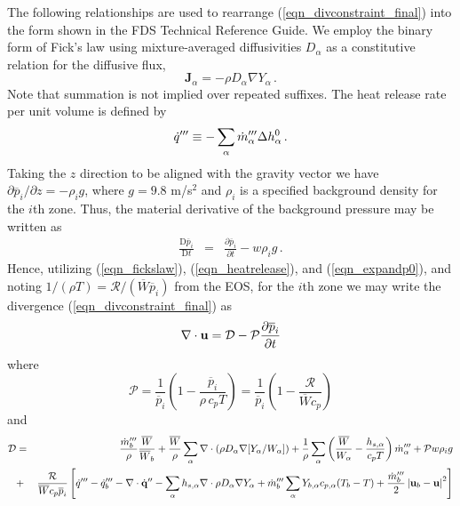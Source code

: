 \documentclass[11pt]{book}
\begin{document}
The following relationships are used to rearrange (\ref{eqn_divconstraint_final}) into
the form shown in the FDS Technical Reference Guide. We employ the binary form of Fick's law using mixture-averaged diffusivities $D_\alpha$ as a constitutive relation for the diffusive flux,
\begin{equation}
\label{eqn_fickslaw}
\mathbf{J}_{\alpha} = - \rho D_\alpha \nabla Y_\alpha \,\mbox{.}
\end{equation}
Note that summation is not implied over repeated suffixes.
The heat release rate per unit volume is defined by
\begin{equation}
\label{eqn_heatrelease}
\dot{q}^{\prime\prime\prime} \equiv -\sum_\alpha \dot{m}_{\alpha}^{\prime\prime\prime} \Delta h^0_\alpha \,\mbox{.}
\end{equation}
Taking the $z$ direction to be aligned with the gravity vector we have $\partial \overline{p}_i/\partial z = -\rho_i g$,
where $g = 9.8$ m/s$^2$ and $\rho_i$ is a specified background density for the $i$th zone.
Thus, the material derivative of the background pressure may be written as
\begin{eqnarray}
\label{eqn_expandp0}
\frac{\mbox{D}\overline{p}_i}{\mbox{D}t} &=& \frac{\partial \overline{p}_i}{\partial t} - w \rho_i g \,\mbox{.}
\end{eqnarray}
Hence, utilizing (\ref{eqn_fickslaw}), (\ref{eqn_heatrelease}), and (\ref{eqn_expandp0}), and noting $1/(\rho T) = \mathcal{R}/(\overline{W} \overline{p}_i)$ from the EOS,
for the $i$th zone we may write the divergence (\ref{eqn_divconstraint_final}) as
\begin{equation}
\label{eqn_fds_divcontraint}
\nabla\cdot \mathbf{u} = \mathcal{D} - \mathcal{P} \frac{\partial \overline{p}_i}{\partial t}
\end{equation}
where
\begin{equation}
\label{eqn_fdsP}
\mathcal{P} = \frac{1}{\overline{p}_i}\left( 1 - \frac{\overline{p}_i}{\rho \,c_p T} \right) = \frac{1}{\overline{p}_i}\left( 1 - \frac{\mathcal{R}}{\overline{W} c_p}  \right)
\end{equation}
and
\begin{eqnarray}
\label{eqn_fdsD}
\mathcal{D} &=& \frac{\dot{m}_b^\tripleprime}{\rho}\frac{\overline{W}}{\overline{W}_b} +
                \frac{\overline{W}}{\rho} \sum_\alpha \Div \left( \rho D_\alpha \nabla[Y_\alpha/W_\alpha] \right) +
                \frac{1}{\rho}\sum_\alpha \left( \frac{\overline{W}}{W_\alpha} - \frac{h_{s,\alpha}}{c_p T} \right) \dot{m}_{\alpha}^\tripleprime  +
                \mathcal{P} w \rho_i g \nonumber \vspace{0.3cm} \\
&+& \frac{\mathcal{R}}{\overline{W} c_p \overline{p}_i} \left[ \dot{q}^\tripleprime - \dq_b''' - \Div \dot{\mathbf{q}}^{\prime\prime} -
                \sum_\alpha h_{s,\alpha} \Div \rho D_\alpha \nabla Y_\alpha + \dot{m}_{b}^{\tripleprime} \sum_\alpha Y_{b,\alpha} c_{p,\alpha}(T_b-T) +
                \frac{\dot{m}_{b}^{\tripleprime}}{2}\left|\mathbf{u}_b-\mathbf{u}\right|^2  \right] \nonumber \vspace{0.3cm} \\
\end{eqnarray}
\end{document}
